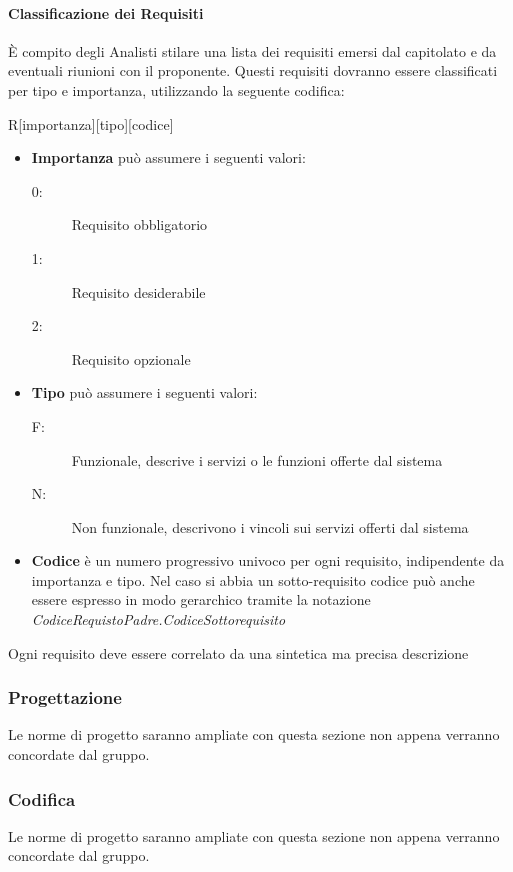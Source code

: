 \documentclass[12pt,a4paper]{article}
\begin{document}
\paragraph{Classificazione dei Requisiti}
È compito degli Analisti stilare una lista dei requisiti emersi dal capitolato e da eventuali
riunioni con il proponente. Questi requisiti dovranno essere classificati per tipo e
importanza, utilizzando la seguente codifica:
\begin{center}
R[importanza][tipo][codice]
\end{center}
\begin{itemize}
\item \textbf{Importanza} può assumere i seguenti valori:
\begin{description}
\item[0:] Requisito obbligatorio
\item[1:] Requisito desiderabile
\item[2:] Requisito opzionale
\end{description}
\end{itemize}
\begin{itemize}
\item \textbf{Tipo} può assumere i seguenti valori:
\begin{description}
\item[F:] Funzionale, descrive i servizi o le funzioni offerte dal sistema
\item[N:] Non funzionale, descrivono i vincoli sui servizi offerti dal sistema
\end{description}
\end{itemize}
\begin{itemize}
\item \textbf{Codice} è un numero progressivo univoco per ogni requisito, indipendente da importanza e tipo. Nel caso si abbia un sotto-requisito codice può anche essere espresso in modo gerarchico tramite la notazione \textit{CodiceRequistoPadre.CodiceSottorequisito}
\end{itemize}
Ogni requisito deve essere correlato da una sintetica ma precisa descrizione

\subsubsection{Progettazione}
Le norme di progetto saranno ampliate con questa sezione non appena verranno concordate dal gruppo.

\subsubsection{Codifica}
Le norme di progetto saranno ampliate con questa sezione non appena verranno concordate dal gruppo.
\end{document}
